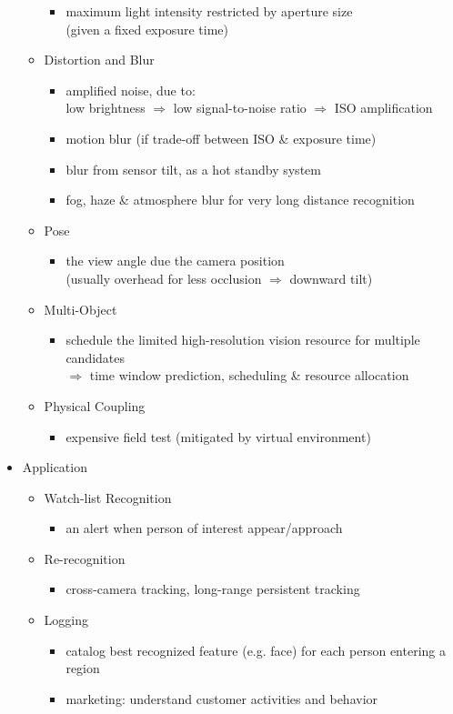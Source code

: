 \begin{itemize}
\begin{itemize}
\begin{itemize}
		\item maximum light intensity restricted by aperture size \\
		(given a fixed exposure time)
		\end{itemize}
	\item Distortion and Blur
		\begin{itemize}
		\item amplified noise, due to: \\
		low brightness $\Rightarrow$ low signal-to-noise ratio $\Rightarrow$ ISO amplification
		\item motion blur (if trade-off between ISO \& exposure time)
		\item blur from sensor tilt, as a hot standby system
		\item fog, haze \& atmosphere blur for very long distance recognition
		\end{itemize}
	\item Pose
		\begin{itemize}
		\item the view angle due the camera position \\ 
		(usually overhead for less occlusion $\Rightarrow$ downward tilt)
		\end{itemize}
	\item Multi-Object
		\begin{itemize}
		\item schedule the limited high-resolution vision resource for multiple candidates \\
		$\Rightarrow$ time window prediction, scheduling \& resource allocation
		\end{itemize}
	\item Physical Coupling
		\begin{itemize}
		\item expensive field test (mitigated by virtual environment)
		\end{itemize}
	\end{itemize}
\item Application
	\begin{itemize}
	\item Watch-list Recognition
		\begin{itemize}
		\item an alert when person of interest appear/approach
		\end{itemize}
	\item Re-recognition
		\begin{itemize}
		\item cross-camera tracking, long-range persistent tracking
		\end{itemize}
	\item Logging
		\begin{itemize}
		\item catalog best recognized feature (e.g. face) for each person entering a region
		\item marketing: understand customer activities and behavior
		\end{itemize}
	\end{itemize}
\end{itemize}

